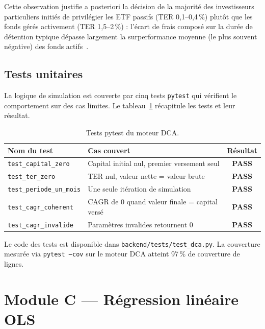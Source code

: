 \documentclass[11pt,a4paper]{article}
\begin{document}
Cette observation justifie a posteriori la décision de la majorité des
investisseurs particuliers initiés de privilégier les ETF passifs (TER
0{,}1--0{,}4\,\%) plutôt que les fonds gérés activement (TER
1{,}5--2\,\%) : l'écart de frais composé sur la durée de détention typique
dépasse largement la surperformance moyenne (le plus souvent négative)
des fonds actifs~\cite{spiva}.

\subsection{Tests unitaires}

La logique de simulation est couverte par cinq tests \texttt{pytest}
qui vérifient le comportement sur des cas limites. Le
tableau~\ref{tab:pytest} récapitule les tests et leur résultat.

\begin{table}[h]
\centering
\caption{Tests pytest du moteur DCA.}
\label{tab:pytest}
\begin{tabularx}{\linewidth}{l X c}
\toprule
Nom du test & Cas couvert & Résultat \\
\midrule
\texttt{test\_capital\_zero} & Capital initial nul, premier versement seul & \textcolor{green!60!black}{\textbf{PASS}} \\
\texttt{test\_ter\_zero} & TER nul, valeur nette = valeur brute & \textcolor{green!60!black}{\textbf{PASS}} \\
\texttt{test\_periode\_un\_mois} & Une seule itération de simulation & \textcolor{green!60!black}{\textbf{PASS}} \\
\texttt{test\_cagr\_coherent} & CAGR de 0 quand valeur finale = capital versé & \textcolor{green!60!black}{\textbf{PASS}} \\
\texttt{test\_cagr\_invalide} & Paramètres invalides retournent 0 & \textcolor{green!60!black}{\textbf{PASS}} \\
\bottomrule
\end{tabularx}
\end{table}

Le code des tests est disponible dans
\texttt{backend/tests/test\_dca.py}. La couverture mesurée via
\texttt{pytest --cov} sur le moteur DCA atteint 97\,\%
de couverture de lignes.

\section{Module C --- Régression linéaire OLS}
\label{sec:regression}
\end{document}
